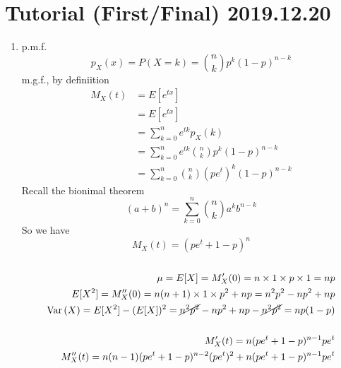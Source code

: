 \documentclass{article}
\makeatletter
\theoremstyle{definition}
\theoremstyle{remark}
\theoremstyle{example}
\newcommand{\Var}[1]{\mathrm{Var}\left(#1\right)}
\newcommand{\skipitems}[1]{%
	\addtocounter{\@enumctr}{#1}%
}
\makeatother
\begin{document}
	\section*{Tutorial (First/Final) 2019.12.20}
	\begin{enumerate}
		\skipitems{1}
		\item p.m.f. \[p_X(x)=P(X=k)={n \choose k} p^k(1-p)^{n-k}\]
		m.g.f., by definiition \begin{align*}
			M_X(t)&=E[e^{tx}]\\
			&=E[e^{tx}]\\
			&= \sum_{k=0}^{n}e^{tk}p_X(k)\\
			&= \sum_{k=0}^{n}e^{tk}{n \choose k}p^k(1-p)^{n-k}\\
			&= \sum_{k=0}^{n} {n \choose k} (pe^t)^k(1-p)^{n-k}
		\end{align*}
		Recall the bionimal theorem \[ (a+b)^n=\sum_{k=0}^{n}{n \choose k} a^kb^{n-k} \]So we have 
		\[M_X(t) = (pe^t+1-p)^n\]
		\\
		\begin{align*}
			\mu = E[X]=M'_X(0)=n \times 1 \times p \times 1 = np\\
			E[X^2]=M''_X(0)=n(n+1) \times 1 \times p^2 + np = n^2p^2-np^2+np\\
			\Var{X}=E[X^2]-(E[X])^2=\cancel{n^2p^2}-np^2+np-\cancel{n^2p^2}=np(1-p)\\
			\\
			M'_X(t)=n(pe^t+1-p)^{n-1}pe^t\\
			M''_X(t)=n(n-1)(pe^t+1-p)^{n-2}(pe^t)^2+n(pe^t+1-p)^{n-1}pe^t
		\end{align*}
		

\end{enumerate}
\end{document}
